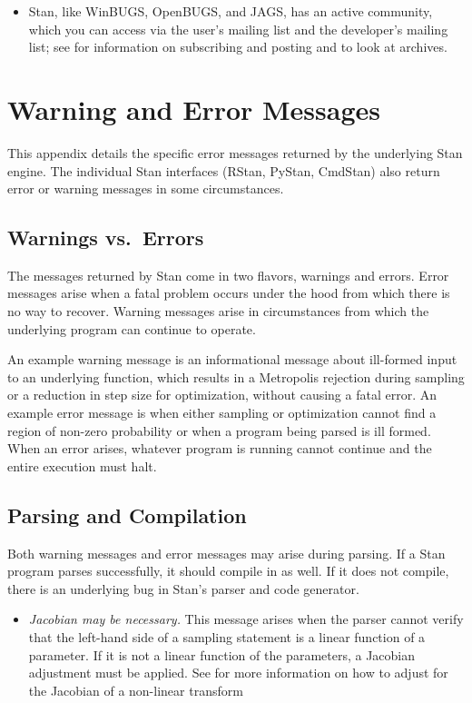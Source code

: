 \begin{itemize}
\item Stan, like WinBUGS, OpenBUGS, and JAGS, has an active community,
  which you can access via the user's mailing list and the developer's
  mailing list; see  for information on
  subscribing and posting and to look at archives.
\end{itemize}


\chapter{Warning and Error Messages}\label{error-messages.appendix}

\noindent
This appendix details the specific error messages returned by the
underlying Stan engine.  The individual Stan interfaces (RStan,
PyStan, CmdStan) also return error or warning messages in some
circumstances.

\section{Warnings vs.\ Errors}

The messages returned by Stan come in two flavors, warnings and
errors.  Error messages arise when a fatal problem occurs under the
hood from which there is no way to recover.  Warning messages arise
in circumstances from which the underlying program can continue to
operate.

An example warning message is an informational message about
ill-formed input to an underlying function, which results in a
Metropolis rejection during sampling or a reduction in step size for
optimization, without causing a fatal error.  An example error message
is when either sampling or optimization cannot find a region of
non-zero probability or when a program being parsed is ill formed.
When an error arises, whatever program is running cannot continue and
the entire execution must halt.

\section{Parsing and Compilation}

Both warning messages and error messages may arise during parsing.  If
a Stan program parses successfully, it should compile in \Cpp as
well.  If it does not compile, there is an underlying bug in Stan's
parser and \Cpp code generator.

\begin{itemize}
\item {\it Jacobian may be necessary.}  This message arises when the
  parser cannot verify that the left-hand side of a sampling statement
  is a linear function of a parameter.  If it is not a linear function
  of the parameters, a Jacobian adjustment must be applied.  See
   for more information on how to
  adjust for the Jacobian of a non-linear transform
\end{itemize}



